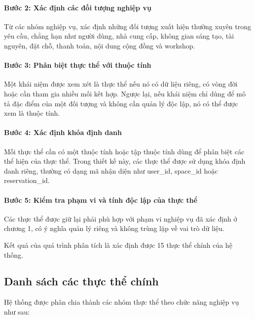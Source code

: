 \paragraph{Bước 2: Xác định các đối tượng nghiệp vụ}\mbox{}\par
Từ các nhóm nghiệp vụ, xác định những đối tượng xuất hiện thường xuyên trong yêu cầu, chẳng hạn như người dùng, nhà cung cấp, không gian sáng tạo, tài nguyên, đặt chỗ, thanh toán, nội dung cộng đồng và workshop.

\paragraph{Bước 3: Phân biệt thực thể với thuộc tính}\mbox{}\par
Một khái niệm được xem xét là thực thể nếu nó có dữ liệu riêng, có vòng đời hoặc cần tham gia nhiều mối kết hợp. Ngược lại, nếu khái niệm chỉ dùng để mô tả đặc điểm của một đối tượng và không cần quản lý độc lập, nó có thể được xem là thuộc tính.

\paragraph{Bước 4: Xác định khóa định danh}\mbox{}\par
Mỗi thực thể cần có một thuộc tính hoặc tập thuộc tính dùng để phân biệt các thể hiện của thực thể. Trong thiết kế này, các thực thể được sử dụng khóa định danh riêng, thường có dạng mã nhận diện như user\_id, space\_id hoặc reservation\_id.

\paragraph{Bước 5: Kiểm tra phạm vi và tính độc lập của thực thể}\mbox{}\par
Các thực thể được giữ lại phải phù hợp với phạm vi nghiệp vụ đã xác định ở chương 1, có ý nghĩa quản lý riêng và không trùng lặp về vai trò dữ liệu.

Kết quả của quá trình phân tích là xác định được 15 thực thể chính của hệ thống.

\subsection{Danh sách các thực thể chính}

Hệ thống được phân chia thành các nhóm thực thể theo chức năng nghiệp vụ như sau:

